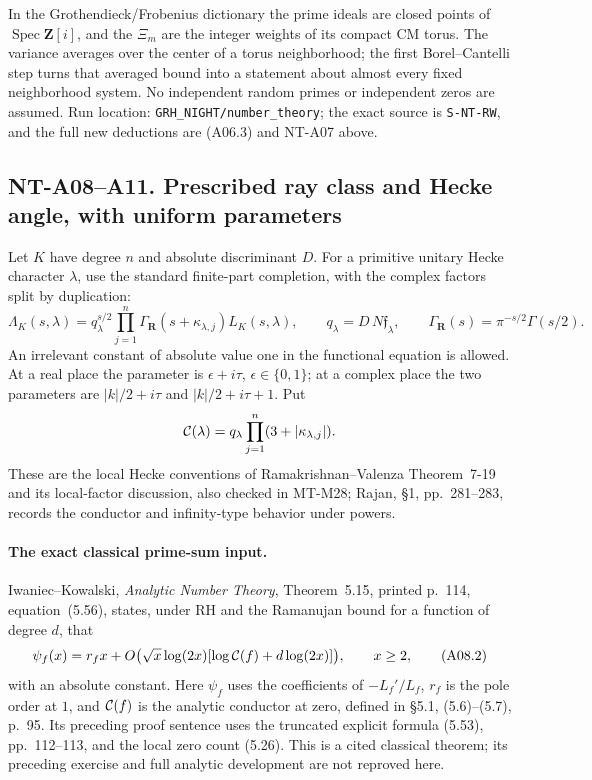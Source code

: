 In the Grothendieck/Frobenius dictionary the prime ideals are
closed points of \(\operatorname{Spec}\mathbf Z[i]\), and the
\(\Xi_m\) are the integer weights of its compact CM torus.
The variance averages over the center of a torus neighborhood;
the first Borel--Cantelli step turns that averaged bound into
a statement about almost every fixed neighborhood system.
No independent random primes or independent zeros are assumed.
Run location: \texttt{GRH\_NIGHT/number\_theory};
the exact source is \texttt{S-NT-RW}, and the full new deductions
are (A06.3) and NT-A07 above.


\subsection*{NT-A08--A11. Prescribed ray class and Hecke angle, with uniform parameters}

Let \(K\) have degree \(n\) and absolute discriminant \(D\).
For a primitive unitary Hecke character \(\lambda\), use the standard
finite-part completion, with the complex factors split by duplication:
\[
 \Lambda_K(s,\lambda)=
 q_\lambda^{s/2}\prod_{j=1}^{n}\Gamma_{\mathbf R}(s+\kappa_{\lambda,j})
 L_K(s,\lambda),\qquad
 q_\lambda=D\,N\mathfrak f_\lambda,\qquad
 \Gamma_{\mathbf R}(s)=\pi^{-s/2}\Gamma(s/2).
                                                        \tag{A08.1}
\]
An irrelevant constant of absolute value one in the functional equation
is allowed. At a real place the parameter is
\(\epsilon+i\tau\), \(\epsilon\in\{0,1\}\); at a complex place the
two parameters are \(|k|/2+i\tau\) and \(|k|/2+i\tau+1\).
Put
\[
 {\cal C}(\lambda)=q_\lambda
                    \prod_{j=1}^{n}(3+|\kappa_{\lambda,j}|).
\]
These are the local Hecke conventions of Ramakrishnan--Valenza
Theorem~7-19 and its local-factor discussion, also checked in
MT-M28; Rajan, \S1, pp.~281--283, records the conductor and
infinity-type behavior under powers.

\paragraph{The exact classical prime-sum input.}
Iwaniec--Kowalski, \emph{Analytic Number Theory}, Theorem~5.15,
printed p.~114, equation~(5.56), states, under RH and the
Ramanujan bound for a function of degree \(d\), that
\[
 \psi_f(x)=r_fx+
 O\bigl(\sqrt x\log(2x)
             [\log{\cal C}(f)+d\log(2x)]\bigr),\qquad x\ge2,
                                                        \tag{A08.2}
\]
with an absolute constant. Here \(\psi_f\) uses the coefficients
of \(-L_f'/L_f\), \(r_f\) is the pole order at \(1\), and
\({\cal C}(f)\) is the analytic conductor at zero, defined in
\S5.1, (5.6)--(5.7), p.~95.
Its preceding proof sentence uses the truncated explicit formula
(5.53), pp.~112--113, and the local zero count (5.26).
This is a cited classical theorem; its preceding exercise and
full analytic development are not reproved here.

